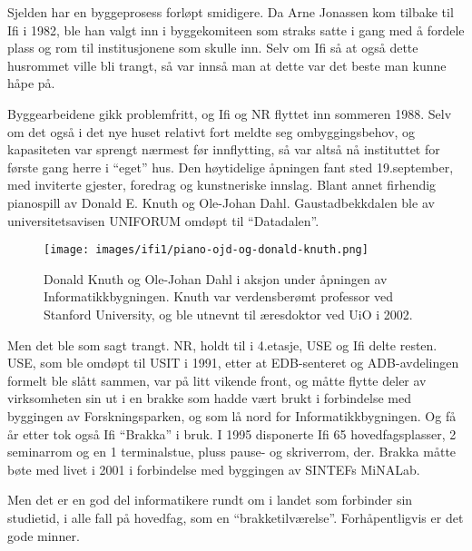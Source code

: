 Sjelden har en byggeprosess forløpt smidigere. Da Arne Jonassen kom tilbake til Ifi i 1982, ble han valgt inn i byggekomiteen som straks satte i gang med å fordele plass og rom til institusjonene som skulle inn. Selv om Ifi så at også dette husrommet ville bli trangt, så var innså man at dette var det beste man kunne håpe på.

Byggearbeidene gikk problemfritt, og Ifi og NR flyttet inn sommeren 1988. Selv om det også i det nye huset relativt fort meldte seg ombyggingsbehov, og kapasiteten var sprengt nærmest før innflytting, så var altså nå instituttet for første gang herre i ``eget'' hus. Den høytidelige åpningen fant sted 19.september, med inviterte gjester, foredrag og kunstneriske innslag. Blant annet firhendig pianospill av Donald E. Knuth og Ole-Johan Dahl. Gaustadbekkdalen ble av universitetsavisen UNIFORUM omdøpt til ``Datadalen''.

\begin{figure}
	\texttt{[image: images/ifi1/piano-ojd-og-donald-knuth.png]}
	\caption{Donald Knuth og Ole-Johan Dahl i aksjon under åpningen av Informatikkbygningen. Knuth var verdensberømt professor ved Stanford University, og ble utnevnt til æresdoktor ved UiO i 2002.}
\end{figure}

Men det ble som sagt trangt. NR, holdt til i 4.etasje, USE og Ifi delte resten. USE, som ble omdøpt til USIT i 1991, etter at EDB-senteret og ADB-avdelingen formelt ble slått sammen, var på litt vikende front, og måtte flytte deler av virksomheten sin ut i en brakke som hadde vært brukt i forbindelse med byggingen av Forskningsparken, og som lå nord for Informatikkbygningen. Og få år etter tok også Ifi ``Brakka'' i bruk. I 1995 disponerte Ifi 65 hovedfagsplasser, 2 seminarrom og en 1 terminalstue, pluss pause- og skriverrom, der. Brakka måtte bøte med livet i 2001 i forbindelse med byggingen av SINTEFs MiNALab.

Men det er en god del informatikere rundt om i landet som forbinder sin studietid, i alle fall på hovedfag, som en ``brakketilværelse''. Forhåpentligvis er det gode minner.

